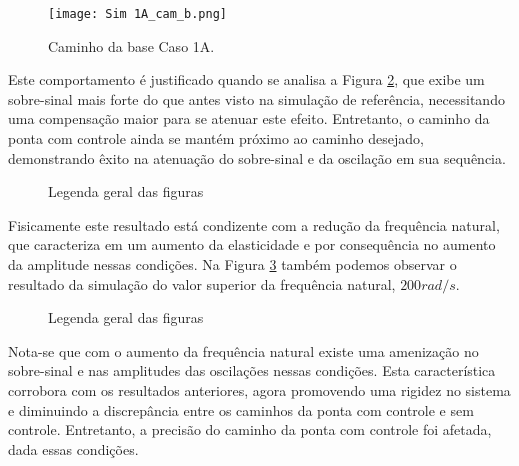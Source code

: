 \begin{figure}[H]
    \centering
    \caption{Caminho da base Caso 1A.}
    \texttt{[image: Sim 1A\_cam\_b.png]}

    \label{fig:1A_cam_b}
\end{figure}

Este comportamento é justificado quando se analisa a Figura \ref{fig:1A_cam_p_s}, que exibe um sobre-sinal mais forte do que antes visto na simulação de referência, necessitando uma compensação maior para se atenuar este efeito. Entretanto, o caminho da ponta com controle ainda se mantém próximo ao caminho desejado, demonstrando êxito na atenuação do sobre-sinal e da oscilação em sua sequência.

\begin{figure}[H]
    \centering
    \hfill
    \caption{Legenda geral das figuras}
    \label{fig:1A_cam_p_s}
\end{figure}

Fisicamente este resultado está condizente com a redução da frequência natural, que caracteriza em um aumento da elasticidade e por consequência no aumento da amplitude nessas condições. Na Figura \ref{fig:1B_cam_p_s} também podemos observar o resultado da simulação do valor superior da frequência natural, \(200 rad/s\). 

\begin{figure}[H]
    \centering
    \hfill
    \caption{Legenda geral das figuras}
    \label{fig:1B_cam_p_s}
\end{figure}

Nota-se que com o aumento da frequência natural existe uma amenização no sobre-sinal e nas amplitudes das oscilações nessas condições. Esta característica corrobora com os resultados anteriores, agora promovendo uma rigidez no sistema e diminuindo a discrepância entre os caminhos da ponta com controle e sem controle. Entretanto, a precisão do caminho da ponta com controle foi afetada, dada essas condições.

